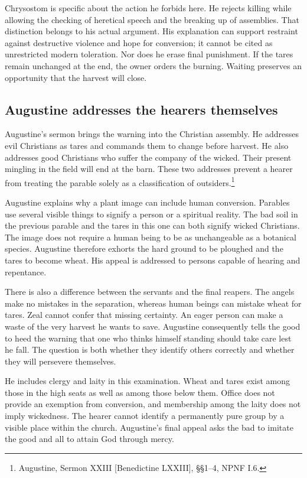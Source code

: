 Chrysostom is specific about the action he forbids here. He rejects
killing while allowing the checking of heretical speech and the breaking
up of assemblies. That distinction belongs to his actual argument. His
explanation can support restraint against destructive violence and hope
for conversion; it cannot be cited as unrestricted modern toleration.
Nor does he erase final punishment. If the tares remain unchanged at
the end, the owner orders the burning. Waiting preserves an opportunity
that the harvest will close.

\subsection{Augustine addresses the hearers themselves}
Augustine's sermon brings the warning into the Christian assembly.
He addresses evil Christians as tares and commands them to change before
harvest. He also addresses good Christians who suffer the company of
the wicked. Their present mingling in the field will end at the barn.
These two addresses prevent a hearer from treating the parable solely
as a classification of outsiders.\footnote{Augustine, Sermon XXIII
[Benedictine LXXIII], §§1--4, NPNF I.6.}

Augustine explains why a plant image can include human conversion.
Parables use several visible things to signify a person or a spiritual
reality. The bad soil in the previous parable and the tares in this one
can both signify wicked Christians. The image does not require a human
being to be as unchangeable as a botanical species. Augustine therefore
exhorts the hard ground to be ploughed and the tares to become wheat.
His appeal is addressed to persons capable of hearing and repentance.

There is also a difference between the servants and the final reapers.
The angels make no mistakes in the separation, whereas human beings
can mistake wheat for tares. Zeal cannot confer that missing certainty.
An eager person can make a waste of the very harvest he wants to save.
Augustine consequently tells the good to heed the warning that one who
thinks himself standing should take care lest he fall. The question is
both whether they identify others correctly and whether they will
persevere themselves.

He includes clergy and laity in this examination. Wheat and tares exist
among those in the high seats as well as among those below them. Office
does not provide an exemption from conversion, and membership among the
laity does not imply wickedness. The hearer cannot identify a permanently
pure group by a visible place within the church. Augustine's final appeal
asks the bad to imitate the good and all to attain God through mercy.

